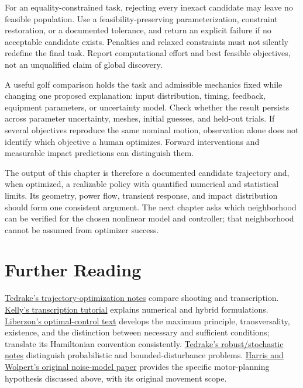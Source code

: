 \documentclass[12pt, openany]{book}
\theoremstyle{plain}
\begin{document}
For an equality-constrained task, rejecting every inexact candidate may leave
no feasible population. Use a feasibility-preserving parameterization,
constraint restoration, or a documented tolerance, and return an explicit
failure if no acceptable candidate exists. Penalties and relaxed constraints
must not silently redefine the final task. Report computational effort and
best feasible objectives, not an unqualified claim of global discovery.

A useful golf comparison holds the task and admissible mechanics fixed while
changing one proposed explanation: input distribution, timing, feedback,
equipment parameters, or uncertainty model. Check whether the result
persists across parameter uncertainty, meshes, initial guesses, and held-out
trials. If several objectives reproduce the same nominal motion, observation
alone does not identify which objective a human optimizes. Forward
interventions and measurable impact predictions can distinguish them.

The output of this chapter is therefore a documented candidate trajectory
and, when optimized, a realizable policy with quantified numerical and
statistical limits. Its geometry, power flow, transient response, and impact
distribution should form one consistent argument. The next chapter asks
which neighborhood can be verified for the chosen nonlinear model and
controller; that neighborhood cannot be assumed from optimizer success.

\section{Further Reading}

\href{https://underactuated.mit.edu/trajopt.html}{Tedrake's trajectory-optimization
notes} compare shooting and transcription. \href{https://arxiv.org/abs/1707.00284}{Kelly's
transcription tutorial} explains numerical and hybrid formulations.
\href{https://liberzon.csl.illinois.edu/teaching/cvoc/node1.html}{Liberzon's
optimal-control text} develops the maximum principle, transversality,
existence, and the distinction between necessary and sufficient conditions;
translate its Hamiltonian convention consistently.
\href{https://underactuated.mit.edu/robust.html}{Tedrake's robust/stochastic
notes} distinguish probabilistic and bounded-disturbance problems.
\href{https://www.nature.com/articles/29528}{Harris and Wolpert's original
noise-model paper} provides the specific motor-planning hypothesis discussed
above, with its original movement scope.
\end{document}
